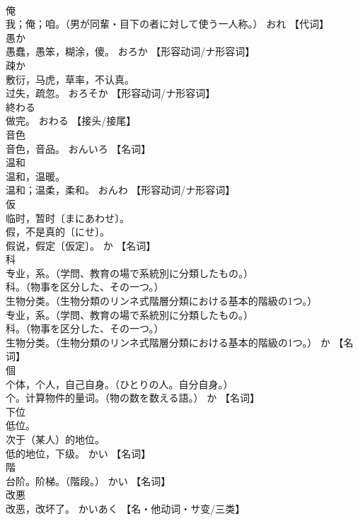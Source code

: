 \documentclass[8pt]{extreport}
\begin{document}
\begin{CJK}{UTF8}{min}
\\	俺	
\\	我；俺；咱。（男が同輩・目下の者に対して使う一人称。）	おれ		【代词】
\\	愚か	
\\	愚蠢，愚笨，糊涂，傻。	おろか		【形容动词/ナ形容词】
\\	疎か	
\\	敷衍，马虎，草率，不认真。 
\\	过失，疏忽。	おろそか		【形容动词/ナ形容词】
\\	終わる	
\\	做完。	おわる		【接头/接尾】
\\	音色	
\\	音色，音品。	おんいろ		【名词】
\\	温和	
\\	温和，温暖。 
\\	温和；温柔，柔和。	おんわ		【形容动词/ナ形容词】
\\	仮	
\\	临时，暂时〔まにあわせ〕。 
\\	假，不是真的〔にせ〕。 
\\	假说，假定〔仮定〕。	か		【名词】
\\	科	
\\	专业，系。（学問、教育の場で系統別に分類したもの。） 
\\	科。（物事を区分した、その一つ。） 
\\	生物分类。（生物分類のリンネ式階層分類における基本的階級の1つ。） 
\\	专业，系。（学問、教育の場で系統別に分類したもの。） 
\\	科。（物事を区分した、その一つ。） 
\\	生物分类。（生物分類のリンネ式階層分類における基本的階級の1つ。）	か		【名词】
\\	個	
\\	个体，个人，自己自身。（ひとりの人。自分自身。） 
\\	个。计算物件的量词。（物の数を数える語。）	か		【名词】
\\	下位	
\\	低位。 
\\	次于（某人）的地位。 
\\	低的地位，下级。	かい		【名词】
\\	階	
\\	台阶。阶梯。（階段。）	かい		【名词】
\\	改悪	
\\	改恶，改坏了。	かいあく		【名・他动词・サ变/三类】

\end{CJK}
\end{document}
